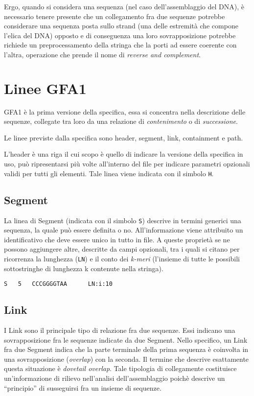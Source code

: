 Ergo, quando si considera una sequenza (nel caso
dell'assemblaggio del DNA), è necessario tenere presente
che un collegamento fra due sequenze potrebbe considerare
una sequenza posta sullo strand (una delle estremità
che compone l'elica del DNA) opposto e di conseguenza una loro
sovrapposizione potrebbe richiede un preprocessamento della
stringa che la porti ad essere coerente con l'altra, operazione
che prende il nome di \emph{reverse and complement}.

\section{Linee GFA1}
GFA1 è la prima versione della specifica, essa si concentra nella descrizione
delle sequenze, collegate tra loro da una relazione di \emph{contenimento}
o di \emph{successione}.

Le linee previste dalla specifica sono header, segment, link, containment
e path.

L'header è una riga il cui scopo è quello di indicare la versione della specifica
in uso, può ripresentarsi più volte all'interno del file per indicare parametri
opzionali validi per tutti gli elementi. Tale linea viene indicata con il simbolo \texttt{H}.

\subsection{Segment}
La linea di Segment (indicata con il simbolo \texttt{S}) descrive in termini
generici una sequenza, la quale può essere definita o no. All'informazione
viene attribuito un identificativo che deve essere unico in tutto in file.
A queste proprietà se ne possono aggiungere altre, descritte da campi
opzionali, tra i quali si citano per ricorrenza la lunghezza (\texttt{LN}) e
il conto dei \emph{k-meri} (l'insieme di tutte le possibili sottostringhe
di lunghezza k contenute nella stringa).

\begin{lstlisting}[caption=Una possibile Segment line.]
S	5	CCCGGGGTAA		LN:i:10
\end{lstlisting}

\subsection{Link}
I Link sono il principale tipo di relazione fra due sequenze. Essi
indicano una sovrapposizione fra le sequenze indicate da due Segment.
Nello specifico, un Link fra due Segment indica che la parte terminale
della prima sequenza è coinvolta in una sovrapposizione (\emph{overlap})
con la seconda. Il termine che descrive esattamente questa situazione
è \emph{dovetail overlap}. Tale tipologia di collegamente costituisce
un'informazione di rilievo nell'analisi dell'assemblaggio poichè descrive
un ``principio'' di susseguirsi fra un insieme di sequenze.

